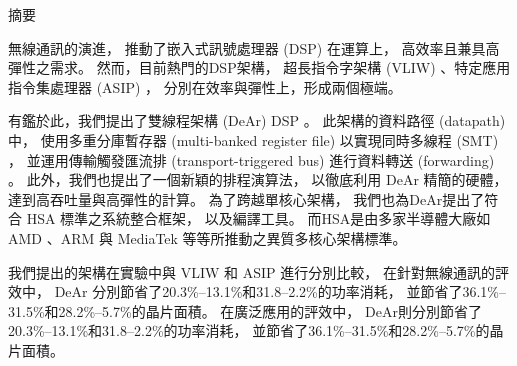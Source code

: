 \documentclass[12pt]{report}
\begin{document}
\begin{CJK}{UTF8}{bkai}
\thispagestyle{empty}
\linespread{1.5}\selectfont
\begin{center}\Large{摘要} \end{center}
    \setlength{\parskip}{1em}
        \par
        無線通訊的演進，
        推動了嵌入式訊號處理器 (DSP) 在運算上，
        高效率且兼具高彈性之需求。
        然而，目前熱門的DSP架構，
        超長指令字架構 (VLIW) 、特定應用指令集處理器 (ASIP) ，
        分別在效率與彈性上，形成兩個極端。
        \par
        有鑑於此，我們提出了雙線程架構 (DeAr) DSP 。
        此架構的資料路徑 (datapath) 中，
        使用多重分庫暫存器 (multi-banked register file) 以實現同時多線程 (SMT) ，
        並運用傳輸觸發匯流排 (transport-triggered bus) 進行資料轉送 (forwarding) 。
        此外，我們也提出了一個新穎的排程演算法，
        以徹底利用 DeAr 精簡的硬體，
        達到高吞吐量與高彈性的計算。
        為了跨越單核心架構，
        我們也為DeAr提出了符合 HSA 標準之系統整合框架，
        以及編譯工具。
        而HSA是由多家半導體大廠如 AMD 、ARM 與 MediaTek 等等所推動之異質多核心架構標準。
        \par
        我們提出的架構在實驗中與 VLIW 和 ASIP 進行分別比較，
        在針對無線通訊的評效中，
        DeAr 分別節省了20.3\%--13.1\%和31.8--2.2\%的功率消耗，
        並節省了36.1\%--31.5\%和28.2\%--5.7\%的晶片面積。
        在廣泛應用的評效中，
        DeAr則分別節省了20.3\%--13.1\%和31.8--2.2\%的功率消耗，
        並節省了36.1\%--31.5\%和28.2\%--5.7\%的晶片面積。
        \par\bigskip
    \clearpage

    \doublespacing
    \setcounter{page}{3}

    \renewcommand{\abstractnamefont}{\normalfont\bfseries}
    \renewcommand{\abstracttextfont}{\normalfont}
    \setlength{\absleftindent}{0pt}
    \setlength{\absrightindent}{0pt}

    \setlength{\parskip}{0em}




\end{CJK}
\end{document}
